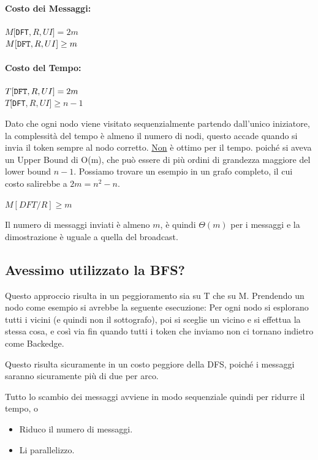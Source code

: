 \paragraph{Costo dei Messaggi:}

\begin{center}
    $M[$\texttt{DFT}$,R,UI] = 2m ~~$\\
    $M[\text{\texttt{DFT}}, R, UI] \geq m$
\end{center}

\paragraph{Costo del Tempo:}

\begin{center}
    $T[\text{\texttt{DFT}}, R, UI] = 2m$\\
    $T[$\texttt{DFT}$,R,UI] \geq n-1 $
\end{center}

Dato che ogni nodo viene visitato sequenzialmente partendo dall'unico
iniziatore, la complessità del tempo è almeno il numero di nodi, questo accade
quando si invia il token sempre al nodo corretto. \underline{Non} è ottimo per
il tempo. poiché si aveva un Upper Bound di O(m), che può essere di più ordini
di grandezza maggiore del lower bound $n-1$. Possiamo trovare un esempio in un
grafo completo, il cui costo salirebbe a $2m=n^2-n$.

\begin{center}
    $M[DFT/R] \geq m$
\end{center}
Il numero di messaggi inviati è almeno $m$, è quindi $\Theta(m)$ per i messaggi
e la dimostrazione è uguale a quella del broadcast.

\subsection{Avessimo utilizzato la BFS?}
Questo approccio risulta in un peggioramento sia su T che su M. Prendendo un
nodo come esempio si avrebbe la seguente esecuzione: Per ogni nodo si esplorano
tutti i vicini (e quindi non il sottografo), poi si sceglie un vicino e si
effettua la stessa cosa, e così via fin quando tutti i token che inviamo non ci
tornano indietro come Backedge.

Questo risulta sicuramente in un costo peggiore della DFS, poiché i messaggi
saranno sicuramente più di due per arco.

Tutto lo scambio dei messaggi avviene in modo sequenziale quindi per ridurre il
tempo, o
\begin{itemize}
    \item Riduco il numero di messaggi.
    \item Li parallelizzo.
\end{itemize}

